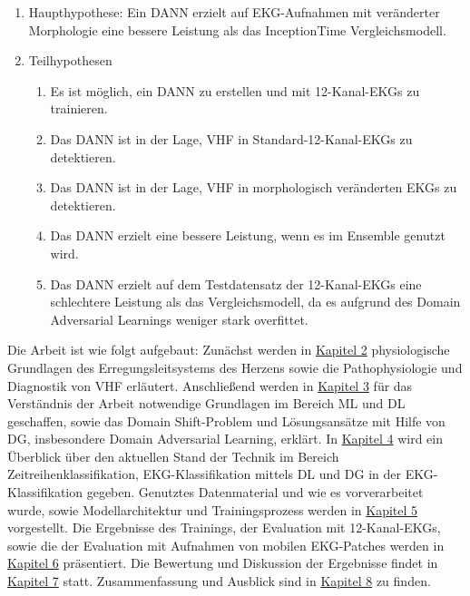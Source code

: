 \begin{enumerate}
\item Haupthypothese:  Ein \gls{DANN} erzielt auf \gls{EKG}-Aufnahmen mit veränderter Morphologie eine bessere Leistung als das InceptionTime Vergleichsmodell.
\item Teilhypothesen
	\begin{enumerate}
	\item Es ist möglich, ein \gls{DANN} zu erstellen und mit 12-Kanal-\gls{EKG}s zu trainieren.
	\item Das \gls{DANN} ist in der Lage, \gls{VHF} in Standard-12-Kanal-\gls{EKG}s zu detektieren.
	\item Das \gls{DANN} ist in der Lage, \gls{VHF} in morphologisch veränderten \gls{EKG}s zu detektieren.
	\item Das \gls{DANN} erzielt eine bessere Leistung, wenn es im Ensemble genutzt wird.
	\item Das \gls{DANN} erzielt auf dem Testdatensatz der 12-Kanal-\gls{EKG}s eine schlechtere Leistung als das Vergleichsmodell, da es aufgrund des Domain Adversarial Learnings weniger stark overfittet.
	\end{enumerate}
\end{enumerate}

Die Arbeit ist wie folgt aufgebaut: Zunächst werden in \hyperref[chap:Physiologische Grundlagen]{Kapitel 2} physiologische Grundlagen des Erregungsleitsystems des Herzens sowie die Pathophysiologie und Diagnostik von \gls{VHF} erläutert. Anschließend werden in \hyperref[chap:MachineLearning]{Kapitel 3} für das Verständnis der Arbeit notwendige Grundlagen im Bereich \gls{ML} und \gls{DL} geschaffen, sowie das Domain Shift-Problem und Lösungsansätze mit Hilfe von \gls{DG}, insbesondere Domain Adversarial Learning, erklärt. In \hyperref[chap:sdt]{Kapitel 4} wird ein Überblick über den aktuellen Stand der Technik im Bereich Zeitreihenklassifikation, \gls{EKG}-Klassifikation mittels \gls{DL} und \gls{DG} in der \gls{EKG}-Klassifikation gegeben. Genutztes Datenmaterial und wie es vorverarbeitet wurde, sowie Modellarchitektur und Trainingsprozess werden in \hyperref[chap:methodik]{Kapitel 5} vorgestellt. Die Ergebnisse des Trainings, der Evaluation mit 12-Kanal-\gls{EKG}s, sowie die der Evaluation mit Aufnahmen von mobilen \gls{EKG}-Patches werden in \hyperref[chap:Ergebnisse]{Kapitel 6} präsentiert. Die Bewertung und Diskussion der Ergebnisse findet in \hyperref[chap:diskussion]{Kapitel 7} statt. Zusammenfassung und Ausblick sind in \hyperref[chap:fazit]{Kapitel 8} zu finden.






 










